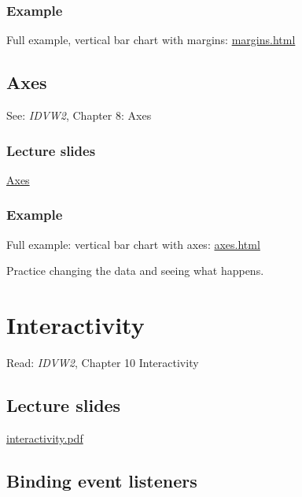 \documentclass[
  openany]{book}
\begin{document}
\hypertarget{example}{%
\subsection{Example}\label{example}}

Full example, vertical bar chart with margins: \href{code/margins.html}{margins.html}

\hypertarget{axes}{%
\section{Axes}\label{axes}}

See: \emph{IDVW2}, Chapter 8: Axes

\hypertarget{lecture-slides-3}{%
\subsection{\texorpdfstring{Lecture slides }{Lecture slides }}\label{lecture-slides-3}}

\href{pdfs/axes.pdf}{Axes}

\hypertarget{example-1}{%
\subsection{Example}\label{example-1}}

Full example: vertical bar chart with axes: \href{code/axes.html}{axes.html}

Practice changing the data and seeing what happens.

\hypertarget{interactivity}{%
\chapter{\texorpdfstring{Interactivity }{Interactivity }}\label{interactivity}}

Read: \emph{IDVW2}, Chapter 10 Interactivity

\hypertarget{lecture-slides-4}{%
\section{\texorpdfstring{Lecture slides }{Lecture slides }}\label{lecture-slides-4}}

\href{pdfs/interactivity.pdf}{interactivity.pdf}

\hypertarget{binding-event-listeners}{%
\section{Binding event listeners}\label{binding-event-listeners}}
\end{document}
